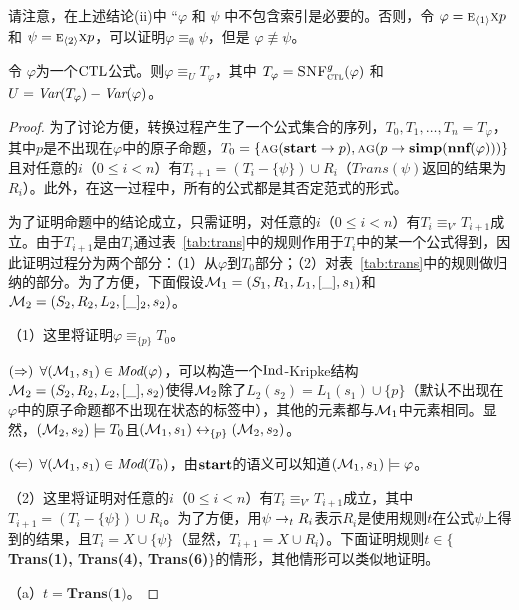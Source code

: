 请注意，在上述结论(ii)中  ``$\varphi$ 和 $\psi$ 中不包含索引是必要的。否则，令 $\varphi=\textsc{e}_{{\langle{1}\rangle}}\textsc{x} p $ 和
$\psi=\textsc{e}_{{\langle{2}\rangle}}\textsc{x} p $，可以证明$\varphi\equiv_\emptyset \psi$，但是 $\varphi\not\equiv\psi$。



\begin{proposition}\label{prop:transform:V:EQ}
	令 $\varphi$为一个$\textrm{CTL}$公式。则$\varphi\equiv_UT_\varphi$，其中 $T_\varphi={\textsc{SNF}_{\textsc{ctl}}^g}(\varphi)$ 和
	$U=\textit{Var}(T_\varphi)-\textit{Var}(\varphi)$。
\end{proposition}
\begin{proof}
	为了讨论方便，转换过程产生了一个公式集合的序列，$T_0, T_1, \dots, T_n=T_{\varphi}$，其中$p$是不出现在$\varphi$中的原子命题，$T_0=\{\textsc{a} \textsc{g}(\textbf{start} \rightarrow p), \textsc{a} \textsc{g}(p \rightarrow \textbf{simp}(\textbf{nnf}(\varphi)))\}$且对任意的$i$（$0\leq i < n$）有$T_{i+1} = (T_i-\{\psi\}) \cup R_i$（$Trans(\psi)$返回的结果为$R_i$）。此外，在这一过程中，所有的公式都是其否定范式的形式。
	
	为了证明命题中的结论成立，只需证明，对任意的$i$（$0\leq i < n$）有$T_i \equiv_{V'} T_{i+1}$成立。由于$T_{i+1}$是由$T_i$通过表~\ref{tab:trans}中的规则作用于$T_i$中的某一个公式得到，因此证明过程分为两个部分：（1）从$\varphi$到$T_0$部分；（2）对表~\ref{tab:trans}中的规则做归纳的部分。为了方便，下面假设${\cal M}_1=(S_1,R_1,L_1,[\_],s_1)$和${\cal M}_2=(S_2,R_2,L_2, [\_]_2, s_2)$。
	
	（1）这里将证明$\varphi \equiv_{\{p\}} T_0$。
	
	$(\Rightarrow)$ $\forall ({\cal M}_1, s_1) \in \textit{Mod}(\varphi)$，可以构造一个$\textrm{Ind}$-Kripke结构${\cal M}_2=(S_2,R_2,L_2,[\_],s_2)$使得${\cal M}_2$除了$L_2(s_2)=L_1(s_1) \cup \{p\}$（默认不出现在$\varphi$中的原子命题都不出现在状态的标签中），其他的元素都与${\cal M}_1$中元素相同。显然，$({\cal M}_2,s_2)\models T_0$且$({\cal M}_1,s_1) \leftrightarrow_{\{p\}} ({\cal M}_2, s_2)$。
	
	$(\Leftarrow)$ $\forall ({\cal M}_1,s_1) \in \textit{Mod}(T_0)$，由$\textbf{start}$的语义可以知道$({\cal M}_1,s_1) \models \varphi$。
	
	（2）这里将证明对任意的$i$（$0\leq i < n$）有$T_i \equiv_{V'} T_{i+1}$成立，其中$T_{i+1} = (T_i-\{\psi\}) \cup R_i$。为了方便，用$\psi \rightarrow_t R_i$表示$R_i$是使用规则$t$在公式$\psi$上得到的结果，且$T_i=X\cup \{\psi\}$（显然，$T_{i+1}=X\cup R_i$）。下面证明规则$t\in \{$\textbf{Trans(1), Trans(4), Trans(6)}$\}$的情形，其他情形可以类似地证明。
	
	（a）$t=\textbf{Trans(1)}$。
	

\end{proof}
